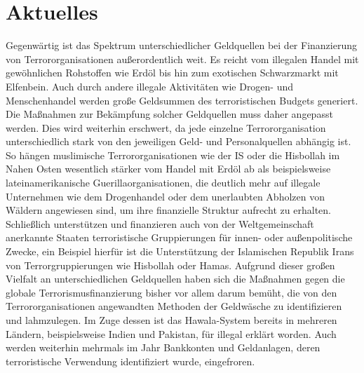 \documentclass[a4paper,11pt]{article}
\begin{document}
    \section{Aktuelles}
   Gegenwärtig ist das Spektrum unterschiedlicher Geldquellen bei der Finanzierung von Terrororganisationen außerordentlich weit. Es reicht vom illegalen Handel mit gewöhnlichen Rohstoffen wie Erdöl bis hin zum exotischen Schwarzmarkt mit Elfenbein. Auch durch andere illegale Aktivitäten wie Drogen- und Menschenhandel werden große Geldsummen des terroristischen Budgets generiert. Die Maßnahmen zur Bekämpfung solcher Geldquellen muss daher angepasst werden. Dies wird weiterhin erschwert, da jede einzelne Terrororganisation unterschiedlich stark von den jeweiligen Geld- und Personalquellen abhängig ist. So hängen muslimische Terrororganisationen wie der IS oder die Hisbollah im Nahen Osten wesentlich stärker vom Handel mit Erdöl ab als beispielsweise lateinamerikanische Guerillaorganisationen, die deutlich mehr auf illegale Unternehmen wie dem Drogenhandel oder dem unerlaubten Abholzen von Wäldern angewiesen sind, um ihre finanzielle Struktur aufrecht zu erhalten. Schließlich unterstützen und finanzieren auch von der Weltgemeinschaft anerkannte Staaten terroristische Gruppierungen für innen- oder außenpolitische Zwecke, ein Beispiel hierfür ist die Unterstützung der Islamischen Republik Irans von Terrorgruppierungen wie Hisbollah oder Hamas. Aufgrund dieser großen Vielfalt an unterschiedlichen Geldquellen haben sich die Maßnahmen gegen die globale Terrorismusfinanzierung bisher vor allem darum bemüht, die von den Terrororganisationen angewandten Methoden der Geldwäsche zu identifizieren und lahmzulegen. Im Zuge dessen ist das Hawala-System bereits in mehreren Ländern, beispielsweise Indien und Pakistan, für illegal erklärt worden. Auch werden weiterhin mehrmals im Jahr Bankkonten und Geldanlagen, deren terroristische Verwendung identifiziert wurde, eingefroren.
\\ \\
\end{document}
